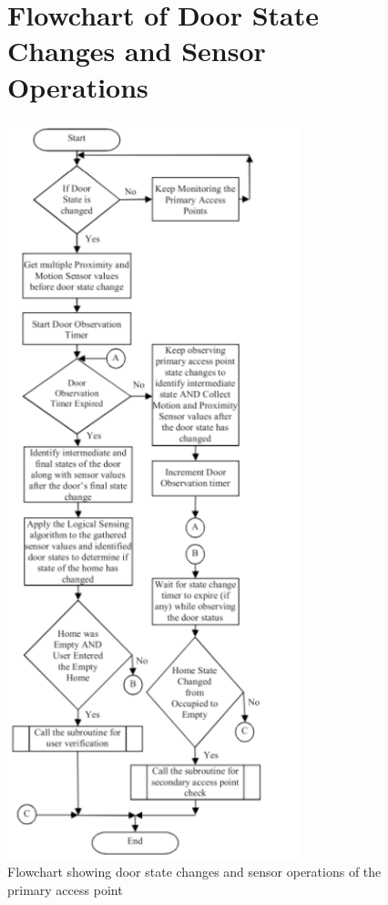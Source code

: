 \begin{appendices}
\begin{figure}[ht!]
        \section{Flowchart of Door State Changes and Sensor Operations \cite{joseMalekian2017}}
        \label{sec:flowchart-of-door-state-changes-and-sensor-operations}
        \begin{adjustbox}{width=\linewidth, totalheight=\dimexpr\textheight-1.2in\relax, keepaspectratio}
            \includegraphics{datasets/images/A2} %
        \end{adjustbox}
        \caption{Flowchart showing door state changes and sensor operations of the primary access point}
        \label{fig:figure5}
        \cleardoublepage
    \end{figure}


\end{appendices}
